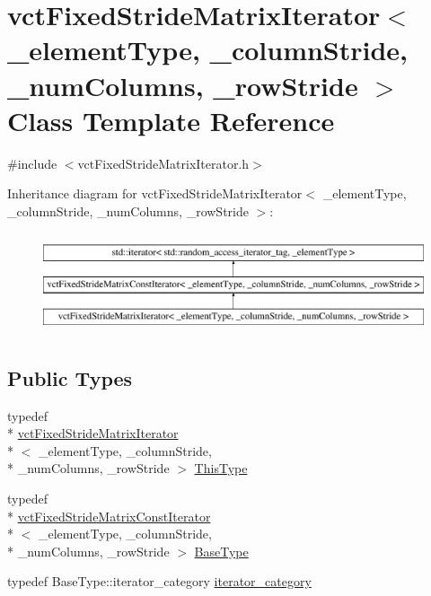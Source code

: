 \hypertarget{classvct_fixed_stride_matrix_iterator}{\section{vct\-Fixed\-Stride\-Matrix\-Iterator$<$ \-\_\-element\-Type, \-\_\-column\-Stride, \-\_\-num\-Columns, \-\_\-row\-Stride $>$ Class Template Reference}
\label{classvct_fixed_stride_matrix_iterator}
}


{\ttfamily \#include $<$vct\-Fixed\-Stride\-Matrix\-Iterator.\-h$>$}

Inheritance diagram for vct\-Fixed\-Stride\-Matrix\-Iterator$<$ \-\_\-element\-Type, \-\_\-column\-Stride, \-\_\-num\-Columns, \-\_\-row\-Stride $>$\-:\begin{figure}[H]
\begin{center}
\leavevmode
\includegraphics[height=3.000000cm]{d9/d4f/classvct_fixed_stride_matrix_iterator}
\end{center}
\end{figure}
\subsection*{Public Types}
\begin{DoxyCompactItemize}
\item 
typedef \\*
\hyperlink{classvct_fixed_stride_matrix_iterator}{vct\-Fixed\-Stride\-Matrix\-Iterator}\\*
$<$ \-\_\-element\-Type, \-\_\-column\-Stride, \\*
\-\_\-num\-Columns, \-\_\-row\-Stride $>$ \hyperlink{classvct_fixed_stride_matrix_iterator_a99a6088a50b066ba920c9138d7b3a950}{This\-Type}
\item 
typedef \\*
\hyperlink{classvct_fixed_stride_matrix_const_iterator}{vct\-Fixed\-Stride\-Matrix\-Const\-Iterator}\\*
$<$ \-\_\-element\-Type, \-\_\-column\-Stride, \\*
\-\_\-num\-Columns, \-\_\-row\-Stride $>$ \hyperlink{classvct_fixed_stride_matrix_iterator_a9711a47a94c8d65a5f91c5064914f326}{Base\-Type}
\item 
typedef Base\-Type\-::iterator\-\_\-category \hyperlink{classvct_fixed_stride_matrix_iterator_aa33a65dee36b4ac1f9fb5479ce074742}{iterator\-\_\-category}
\end{DoxyCompactItemize}
